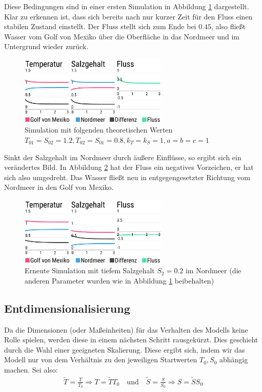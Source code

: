 \documentclass[a4paper,twoside]{article}
\begin{document}
	Diese Bedingungen sind in einer ersten Simulation in Abbildung \ref{fig:modell_q_pos}  dargestellt. Klar zu erkennen ist, dass sich bereits nach nur kurzer Zeit für den Fluss einen stabilen Zustand einstellt. Der Fluss stellt sich zum Ende bei \(0.45\), also fließt Wasser vom Golf von Mexiko über die Oberfläche in das Nordmeer und im Untergrund wieder zurück.
	
	\begin{figure}[!h]
  		\centering
 		\includegraphics[width=7cm]{../Diagramme/temp-salt-flow_q-pos.png}
  		\caption{Simulation mit folgenden theoretischen Werten \(T_{01} = S_{02} = 1.2, T_{02} = S_{01} = 0.8, k_T = k_S = 1, a = b = c = 1\)}
  		\label{fig:modell_q_pos}
	\end{figure}
	
	Sinkt der Salzgehalt im Nordmeer durch äußere Einflüsse, so ergibt sich ein verändertes Bild. In Abbildung \ref{fig:modell_q_neg} hat der Fluss ein negatives Vorzeichen, er hat sich also umgedreht. Das Wasser fließt neu in entgegengesetzter Richtung vom Nordmeer in den Golf von Mexiko.
	\begin{figure}[!h]
  		\centering
 		\includegraphics[width=7cm]{../Diagramme/temp-salt-flow_q-neg.png}
  		\caption{Erneute Simulation mit tiefem Salzgehalt \(S_2 = 0.2\) im Nordmeer (die anderen Parameter wurden wie in Abbildung \ref{fig:modell_q_pos} beibehalten)}
  		\label{fig:modell_q_neg}
	\end{figure}
	
	\subsection{Entdimensionalisierung}
	Da die Dimensionen (oder Maßeinheiten) für das Verhalten des Modells keine Rolle spielen, werden diese in einem nächsten Schritt rausgekürzt. Dies geschieht durch die Wahl einer geeigneten Skalierung. Diese ergibt sich, indem wir das Modell nur von dem Verhältnis zu den jeweiligen Startwerten \(T_0, S_0\) abhängig machen. Sei also:
	\begin{align*}
		\tilde{T} = \frac{T}{T_0} \Rightarrow T = \tilde{T} T_0 \quad \textrm{und} \quad \tilde{S} = \frac{S}{S_0} \Rightarrow S = \tilde{S} S_0
	\end{align*}
	
\end{document}
